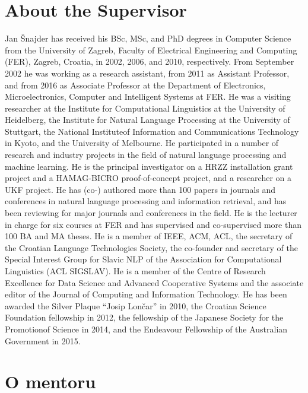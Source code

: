 \thispagestyle{empty}

\section*{About the Supervisor}


Jan Šnajder has received his BSc, MSc, and PhD degrees in Computer Science from
the University of Zagreb, Faculty of Electrical Engineering and Computing
(FER), Zagreb, Croatia, in 2002, 2006, and 2010, respectively. From September
2002 he was working as a research assistant, from 2011 as Assistant Professor,
and from 2016 as Associate Professor at the Department of Electronics,
Microelectronics, Computer and Intelligent Systems at FER. He was a
visiting researcher at the Institute for Computational Linguistics at the
University of Heidelberg, the Institute for Natural Language Processing at the
University of Stuttgart, the National Instituteof Information and
Communications Technology in Kyoto, and the University of Melbourne. He
participated in a number of research and industry projects in the field of
natural language processing and machine learning. He is the principal
investigator on a HRZZ installation grant project and a HAMAG-BICRO
proof-of-concept project, and a researcher on a UKF project. He has (co-)
authored more than 100 papers in journals and conferences in natural
language processing and information retrieval, and has been reviewing for major
journals and conferences in the field. He is the lecturer in charge for six
courses at FER and has supervised and co-supervised more than 100 BA and MA
theses. He is a member of IEEE, ACM, ACL, the secretary of the Croatian
Language Technologies Society, the co-founder and secretary of the Special
Interest Group for Slavic NLP of the Association for Computational Linguistics
(ACL SIGSLAV). He is a member of the Centre of Research Excellence for Data
Science and Advanced Cooperative Systems and the associate editor of the
Journal of Computing and Information Technology. He has been awarded the Silver
Plaque ``Josip Lončar'' in 2010, the Croatian Science Foundation fellowship in
2012, the fellowship of the Japanese Society for the Promotionof Science in
2014, and the Endeavour Fellowship of the Australian Government in 2015.


\section*{O mentoru}


